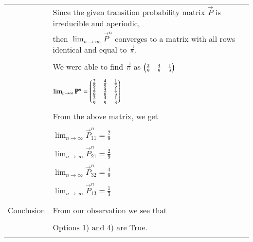 \documentclass[journal,12pt]{IEEEtran}
\begin{document}
\begin{longtable}{|l|l|}
		
		& Since the given transition probability matrix $\vec{P}$ is irreducible and aperiodic, \\
		& then $\lim_{n \to \infty} \vec{P}^{n}$ converges to a matrix with all rows identical and equal to $\vec{\pi}$. \\
		& \\
		& We were able to find $\vec{\pi}$ as $\begin{pmatrix}\frac{2}{9} & \frac{4}{9} & \frac{1}{3}\end{pmatrix}$ \\
		& \\
		& $\lim_{n \to \infty} \mathbf{P}^{n} = \begin{pmatrix}\frac{2}{9}&\frac{4}{9}&\frac{1}{3}\\\frac{2}{9}&\frac{4}{9}&\frac{1}{3}\\\frac{2}{9}&\frac{4}{9}&\frac{1}{3}\end{pmatrix}$\\
		& \\
		& From the above matrix, we get \\
		& \\
		& $\lim_{n \to \infty} \vec{P}^{n}_{11} = \frac{2}{9}$ \\
		&\\
		& $\lim_{n \to \infty} \vec{P}^{n}_{21} = \frac{2}{9}$ \\
		&\\
		& $\lim_{n \to \infty} \vec{P}^{n}_{32} = \frac{4}{9}$ \\
		&\\
		& $\lim_{n \to \infty} \vec{P}^{n}_{13} = \frac{1}{3}$ \\
		&\\
		\hline
		\multirow{3}{*}{Conclusion} & \\
		& From our observation we see that \\
		&\\
		& Options 1) and 4) are True.\\
		& \\
		\hline
	\end{longtable}
\end{document}
